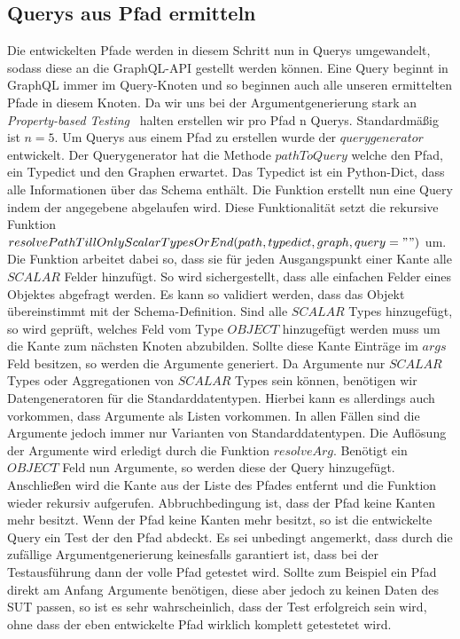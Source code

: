 \subsection{Querys aus Pfad ermitteln}

Die entwickelten Pfade werden in diesem Schritt nun in Querys umgewandelt, sodass diese an die GraphQL-API
gestellt werden können.
Eine Query beginnt in GraphQL immer im Query-Knoten und so beginnen auch alle unseren ermittelten Pfade in diesem Knoten.
Da wir uns bei der Argumentgenerierung stark an \textit{Property-based Testing}~\cite{property-based-testing} halten
erstellen wir pro Pfad n Querys.
Standardmäßig ist $n = 5$.
Um Querys aus einem Pfad zu erstellen wurde der $querygenerator$ entwickelt.
Der Querygenerator hat die Methode $pathToQuery$ welche den Pfad, ein Typedict und den Graphen erwartet.
Das Typedict ist ein Python-Dict, dass alle Informationen über das Schema enthält.
Die Funktion erstellt nun eine Query indem der angegebene abgelaufen wird.
Diese Funktionalität setzt die rekursive Funktion $resolvePathTillOnlyScalarTypesOrEnd(path, typedict, graph, query="")$ um.
Die Funktion arbeitet dabei so, dass sie für jeden Ausgangspunkt einer Kante alle $SCALAR$ Felder hinzufügt.
So wird sichergestellt, dass alle einfachen Felder eines Objektes abgefragt werden.
Es kann so validiert werden, dass das Objekt übereinstimmt mit der Schema-Definition.
Sind alle $SCALAR$ Types hinzugefügt, so wird geprüft, welches Feld vom Type $OBJECT$ hinzugefügt werden muss um die Kante
zum nächsten Knoten abzubilden.
Sollte diese Kante Einträge im $args$ Feld besitzen, so werden die Argumente generiert.
Da Argumente nur $SCALAR$ Types oder Aggregationen von $SCALAR$ Types sein können, benötigen wir Datengeneratoren für die Standarddatentypen.
Hierbei kann es allerdings auch vorkommen, dass Argumente als Listen vorkommen.
In allen Fällen sind die Argumente jedoch immer nur Varianten von Standarddatentypen.
Die Auflösung der Argumente wird erledigt durch die Funktion $resolveArg$.
Benötigt ein $OBJECT$ Feld nun Argumente, so werden diese der Query hinzugefügt.
Anschließen wird die Kante aus der Liste des Pfades entfernt und die Funktion wieder rekursiv aufgerufen.
Abbruchbedingung ist, dass der Pfad keine Kanten mehr besitzt.
Wenn der Pfad keine Kanten mehr besitzt, so ist die entwickelte Query ein Test der den Pfad abdeckt.
Es sei unbedingt angemerkt, dass durch die zufällige Argumentgenerierung keinesfalls garantiert ist, dass bei der
Testausführung dann der volle Pfad getestet wird.
Sollte zum Beispiel ein Pfad direkt am Anfang Argumente benötigen, diese aber jedoch zu keinen Daten des SUT passen, so ist es sehr
wahrscheinlich, dass der Test erfolgreich sein wird, ohne dass der eben entwickelte Pfad wirklich komplett getestetet wird.

